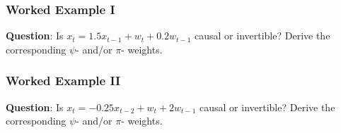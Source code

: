 \documentclass[%
xcolor=pdftex]{beamer}
\begin{document}
\begin{frame}
\frametitle{Worked Example I}

\textbf{Question}: Is $x_t = 1.5x_{t-1} + w_t + 0.2 w_{t-1}$ causal or invertible? Derive the corresponding $\psi$- and/or $\pi$- weights.

\vspace{50mm}

\end{frame}

\begin{frame}
\frametitle{Worked Example II}

\textbf{Question}: Is $x_t = -0.25x_{t-2} + w_t + 2 w_{t-1}$ causal or invertible? Derive the corresponding $\psi$- and/or $\pi$- weights.

\vspace{50mm}



\end{frame}






\end{document}
